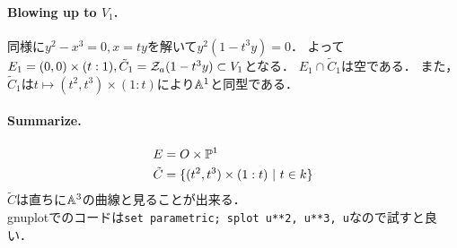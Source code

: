 \documentclass[a4paper]{jsarticle}
\begin{document}
    \paragraph{Blowing up to $V_1$.}
    同様に$y^2-x^3=0, x=ty$を解いて$y^2 (1-t^3 y)=0$．
    よって$E_1=(0,0) \times (t:1), \tilde{C}_1=\mathcal{Z}_a(1-t^3 y) \subset V_1$となる．
    $E_1 \cap \tilde{C}_1$は空である．
    また，$\tilde{C}_1$は$t \mapsto (t^2,t^3) \times (1:t)$により$\mathbb{A}^1$と同型である．

    \paragraph{Summarize.}
    \begin{align*}
        E &= O \times \mathbb{P}^1 \\
        \tilde{C} &=\{ (t^2,t^3) \times (1:t) ~|~ t \in k \}
    \end{align*}
    $\tilde{C}$は直ちに$\mathbb{A}^3$の曲線と見ることが出来る． \\
    gnuplotでのコードは\texttt{set parametric; splot u**2, u**3, u}なので試すと良い．
\end{document}
